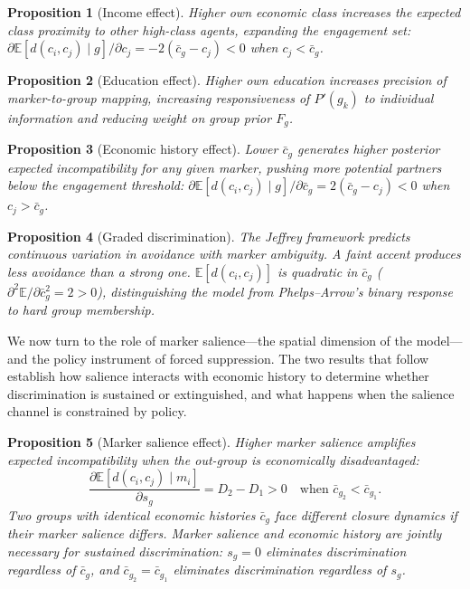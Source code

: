 \documentclass[12pt,a4paper]{article}
\newtheorem{proposition}{Proposition}
\theoremstyle{definition}
\numberwithin{proposition}{subsection}
\newcommand{\E}{\mathbb{E}}
\begin{document}
\begin{proposition}[Income effect]
\label{prop:income}
Higher own economic class increases the expected class proximity to
other high-class agents, expanding the engagement set:
$\partial \E[d(c_i, c_j)\mid g]/\partial c_j = -2(\bar{c}_g - c_j) < 0$ when $c_j < \bar{c}_g$.
\end{proposition}

\begin{proposition}[Education effect]
\label{prop:education}
Higher own education increases precision of marker-to-group mapping,
increasing responsiveness of $P'(g_k)$ to individual information and
reducing weight on group prior $F_g$.
\end{proposition}

\begin{proposition}[Economic history effect]
\label{prop:history}
Lower $\bar{c}_g$ generates higher posterior expected
incompatibility for any given marker, pushing more potential partners
below the engagement threshold:
$\partial \E[d(c_i, c_j)\mid g]/\partial \bar{c}_g = 2(\bar{c}_g - c_j) < 0$ when
$c_j > \bar{c}_g$.
\end{proposition}

\begin{proposition}[Graded discrimination]
\label{prop:graded}
The Jeffrey framework predicts continuous variation in avoidance with
marker ambiguity. A faint accent produces less avoidance than a
strong one. $\E[d(c_i, c_j)]$ is quadratic in $\bar{c}_g$
($\partial^2 \E/\partial \bar{c}_g^2 = 2 > 0$), distinguishing the model
from Phelps--Arrow's binary response to hard group membership.
\end{proposition}

We now turn to the role of marker salience---the spatial dimension
of the model---and the policy instrument of forced suppression. The
two results that follow establish how salience interacts with
economic history to determine whether discrimination is sustained or
extinguished, and what happens when the salience channel is
constrained by policy.

\begin{proposition}[Marker salience effect]
\label{prop:salience}
Higher marker salience amplifies expected incompatibility when the
out-group is economically disadvantaged:
\[
  \frac{\partial \E[d(c_i, c_j) \mid m_i]}{\partial s_g}
  = D_2 - D_1 > 0
  \quad \text{when } \bar{c}_{g_2} < \bar{c}_{g_1}.
\]
Two groups with identical economic histories $\bar{c}_g$ face
different closure dynamics if their marker salience differs. Marker
salience and economic history are jointly necessary for sustained
discrimination: $s_g = 0$ eliminates discrimination regardless of
$\bar{c}_g$, and $\bar{c}_{g_2} = \bar{c}_{g_1}$ eliminates
discrimination regardless of $s_g$.
\end{proposition}
\end{document}
